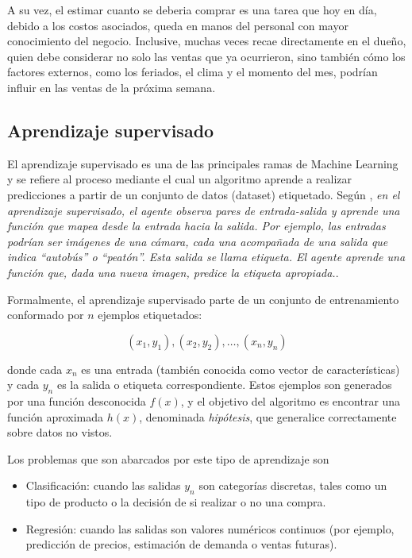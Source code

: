 A su vez, el estimar cuanto se deberia comprar es una tarea que hoy en día, debido a los costos asociados, queda en manos del personal con mayor conocimiento del negocio. Inclusive, muchas veces recae directamente en el dueño, quien debe considerar no solo las ventas que ya ocurrieron, sino también cómo los factores externos, como los feriados, el clima y el momento del mes, podrían influir en las ventas de la próxima semana.

\subsection{Aprendizaje supervisado}

El aprendizaje supervisado es una de las principales ramas de Machine Learning y se refiere al proceso mediante el cual un algoritmo aprende a realizar predicciones a partir de un conjunto de datos (dataset) etiquetado. Según \parencite{russell2022ai}, \guillemotleft{}\emph{en el aprendizaje supervisado, el agente observa pares de entrada-salida y aprende una función que mapea desde la entrada hacia la salida. Por ejemplo, las entradas podrían ser imágenes de una cámara, cada una acompañada de una salida que indica \textquotedblleft autobús\textquotedblright{} o \textquotedblleft peatón\textquotedblright{}. Esta salida se llama etiqueta. El agente aprende una función que, dada una nueva imagen, predice la etiqueta apropiada.}\guillemotright{}.

Formalmente, el aprendizaje supervisado parte de un conjunto de entrenamiento conformado por $n$ ejemplos etiquetados:

\[(x_1, y_1), (x_2, y_2), \ldots, (x_n, y_n)\]

\noindent donde cada $x_n$ es una entrada (también conocida como vector de características) y cada $y_n$ es la salida o etiqueta correspondiente. Estos ejemplos son generados por una función desconocida $f(x)$, y el objetivo del algoritmo es encontrar una función aproximada $h(x)$, denominada \emph{hipótesis}, que generalice correctamente sobre datos no vistos.

Los problemas que son abarcados por este tipo de aprendizaje son

 \begin{itemize}
    \item Clasificación: cuando las salidas $y_n$ son categorías discretas, tales como un tipo de producto o la decisión de si realizar o no una compra.

    \item Regresión: cuando las salidas son valores numéricos continuos (por ejemplo, predicción de precios, estimación de demanda o ventas futuras).
\end{itemize}

